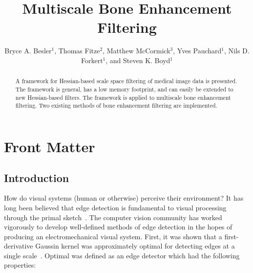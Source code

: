 \documentclass{InsightArticle}
\title{Multiscale Bone Enhancement Filtering}
\author{Bryce A. Besler$^{1}$, Thomas Fitze$^{2}$, Matthew McCormick$^{3}$, Yves Pauchard$^{1}$, Nils D. Forkert$^{1}$, and Steven K. Boyd$^{1}$}
\newcommand{\IJhandlerIDnumber}{0000}
\begin{document}
%
%
\IJhandlefooter{\IJhandlerIDnumber}


\ifpdf
\else
\fi

\maketitle


\ifhtml
\chapter*{Front Matter\label{front}}
\fi


\begin{abstract}
\noindent
A framework for Hessian-based scale space filtering of medical image data is presented.
The framework is general, has a low memory footprint, and can easily be extended to new Hessian-based filters.
The framework is applied to multiscale bone enhancement filtering.
Two existing methods of bone enhancement filtering are implemented.

\end{abstract}

\IJhandlenote{\IJhandlerIDnumber}

\tableofcontents
\newpage
\section{Introduction}
\label{sec:intro}
How do visual systems (human or otherwise) perceive their environment?
It has long been believed that edge detection is fundamental to visual processing through the primal sketch~\cite{marr1980theory}.
The computer vision community has worked vigorously to develop well-defined methods of edge detection in the hopes of producing an electromechanical visual system.
First, it was shown that a first-derivative Gaussin kernel was approximately optimal for detecting edges at a single scale~\cite{Canny1986}.
Optimal was defined as an edge detector which had the following properties:
\end{document}
